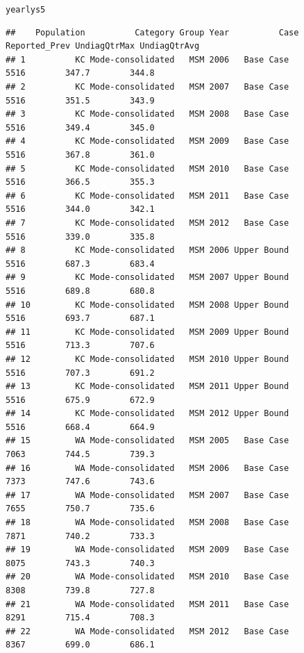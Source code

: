\documentclass{article}\usepackage[]{graphicx}\usepackage[]{color}
\makeatletter
\newcommand{\hlstd}[1]{\textcolor[rgb]{0.345,0.345,0.345}{#1}}%
\newenvironment{kframe}{%
 \def\at@end@of@kframe{}%
 \ifinner\ifhmode%
  \def\at@end@of@kframe{\end{minipage}}%
  \begin{minipage}{\columnwidth}%
 \fi\fi%
 \def\FrameCommand##1{\hskip\@totalleftmargin \hskip-\fboxsep
 \colorbox{shadecolor}{##1}\hskip-\fboxsep
     \hskip-\linewidth \hskip-\@totalleftmargin \hskip\columnwidth}%
 \MakeFramed {\advance\hsize-\width
   \@totalleftmargin\z@ \linewidth\hsize
   \@setminipage}}%
 {\par\unskip\endMakeFramed%
 \at@end@of@kframe}
\newenvironment{knitrout}{}{} %
\makeatother
\begin{document}
\begin{knitrout}\footnotesize
{}\color{fgcolor}\begin{kframe}
\begin{alltt}
\hlstd{yearlys5}
\end{alltt}
\begin{verbatim}
##    Population          Category Group Year          Case Reported_Prev UndiagQtrMax UndiagQtrAvg
## 1          KC Mode-consolidated   MSM 2006   Base Case            5516        347.7        344.8
## 2          KC Mode-consolidated   MSM 2007   Base Case            5516        351.5        343.9
## 3          KC Mode-consolidated   MSM 2008   Base Case            5516        349.4        345.0
## 4          KC Mode-consolidated   MSM 2009   Base Case            5516        367.8        361.0
## 5          KC Mode-consolidated   MSM 2010   Base Case            5516        366.5        355.3
## 6          KC Mode-consolidated   MSM 2011   Base Case            5516        344.0        342.1
## 7          KC Mode-consolidated   MSM 2012   Base Case            5516        339.0        335.8
## 8          KC Mode-consolidated   MSM 2006 Upper Bound            5516        687.3        683.4
## 9          KC Mode-consolidated   MSM 2007 Upper Bound            5516        689.8        680.8
## 10         KC Mode-consolidated   MSM 2008 Upper Bound            5516        693.7        687.1
## 11         KC Mode-consolidated   MSM 2009 Upper Bound            5516        713.3        707.6
## 12         KC Mode-consolidated   MSM 2010 Upper Bound            5516        707.3        691.2
## 13         KC Mode-consolidated   MSM 2011 Upper Bound            5516        675.9        672.9
## 14         KC Mode-consolidated   MSM 2012 Upper Bound            5516        668.4        664.9
## 15         WA Mode-consolidated   MSM 2005   Base Case            7063        744.5        739.3
## 16         WA Mode-consolidated   MSM 2006   Base Case            7373        747.6        743.6
## 17         WA Mode-consolidated   MSM 2007   Base Case            7655        750.7        735.6
## 18         WA Mode-consolidated   MSM 2008   Base Case            7871        740.2        733.3
## 19         WA Mode-consolidated   MSM 2009   Base Case            8075        743.3        740.3
## 20         WA Mode-consolidated   MSM 2010   Base Case            8308        739.8        727.8
## 21         WA Mode-consolidated   MSM 2011   Base Case            8291        715.4        708.3
## 22         WA Mode-consolidated   MSM 2012   Base Case            8367        699.0        686.1

\end{verbatim}
\end{kframe}
\end{knitrout}
\end{document}
